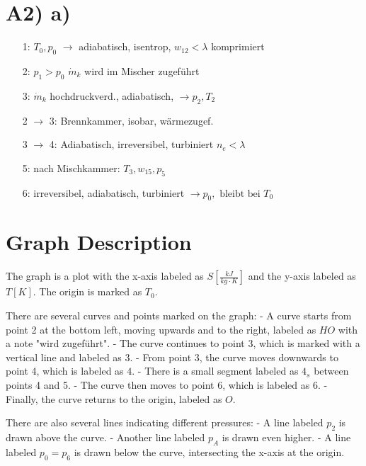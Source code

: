 \section*{A2) a)}

\begin{itemize}
    \item[1:] $T_0, p_0$ \hspace{1cm} $\rightarrow$ \hspace{1cm} adiabatisch, isentrop, $w_{12} < \lambda$ komprimiert
    \item[2:] $p_1 > p_0$ \hspace{1cm} $\dot{m}_k$ \hspace{1cm} wird im Mischer zugeführt
    \item[3:] $\dot{m}_k$ \hspace{1cm} hochdruckverd., adiabatisch, $\rightarrow p_2, T_2$
    \item[2 $\rightarrow$ 3:] Brennkammer, isobar, wärmezugef.
    \item[3 $\rightarrow$ 4:] Adiabatisch, irreversibel, turbiniert $n_e < \lambda$
    \item[5:] nach Mischkammer: $T_3, w_{15}, p_5$
    \item[6:] irreversibel, adiabatisch, turbiniert $\rightarrow p_0, \text{ bleibt bei } T_0$
\end{itemize}

\section*{Graph Description}

The graph is a plot with the x-axis labeled as $S \left[ \frac{kJ}{kg \cdot K} \right]$ and the y-axis labeled as $T \left[ K \right]$. The origin is marked as $T_0$. 

There are several curves and points marked on the graph:
- A curve starts from point 2 at the bottom left, moving upwards and to the right, labeled as $HO$ with a note "wird zugeführt".
- The curve continues to point 3, which is marked with a vertical line and labeled as $3$.
- From point 3, the curve moves downwards to point 4, which is labeled as $4$.
- There is a small segment labeled as $4_s$ between points 4 and 5.
- The curve then moves to point 6, which is labeled as $6$.
- Finally, the curve returns to the origin, labeled as $O$.

There are also several lines indicating different pressures:
- A line labeled $p_2$ is drawn above the curve.
- Another line labeled $p_A$ is drawn even higher.
- A line labeled $p_0 = p_6$ is drawn below the curve, intersecting the x-axis at the origin.

